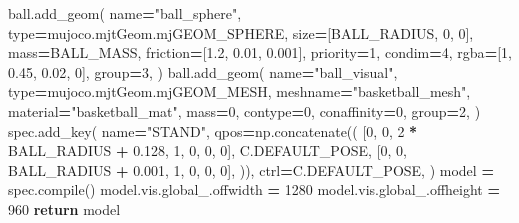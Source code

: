 \documentclass[
  american,
  11pt,
  letterpaper,
]{article}
\newenvironment{Shaded}{\begin{snugshade}}{\end{snugshade}}
\newcommand{\BuiltInTok}[1]{#1}
\newcommand{\ControlFlowTok}[1]{\textcolor[rgb]{0.13,0.29,0.53}{\textbf{#1}}}
\newcommand{\DecValTok}[1]{\textcolor[rgb]{0.00,0.00,0.81}{#1}}
\newcommand{\FloatTok}[1]{\textcolor[rgb]{0.00,0.00,0.81}{#1}}
\newcommand{\NormalTok}[1]{#1}
\newcommand{\OperatorTok}[1]{\textcolor[rgb]{0.81,0.36,0.00}{\textbf{#1}}}
\newcommand{\StringTok}[1]{\textcolor[rgb]{0.31,0.60,0.02}{#1}}
\renewenvironment{Shaded}{\par\smallskip}{\par\smallskip}
\begin{document}
\begin{Shaded}
\begin{Highlighting}[]
\NormalTok{    ball.add\_geom(}
\NormalTok{        name}\OperatorTok{=}\StringTok{"ball\_sphere"}\NormalTok{, }\BuiltInTok{type}\OperatorTok{=}\NormalTok{mujoco.mjtGeom.mjGEOM\_SPHERE,}
\NormalTok{        size}\OperatorTok{=}\NormalTok{[BALL\_RADIUS, }\DecValTok{0}\NormalTok{, }\DecValTok{0}\NormalTok{], mass}\OperatorTok{=}\NormalTok{BALL\_MASS, friction}\OperatorTok{=}\NormalTok{[}\FloatTok{1.2}\NormalTok{, }\FloatTok{0.01}\NormalTok{, }\FloatTok{0.001}\NormalTok{],}
\NormalTok{        priority}\OperatorTok{=}\DecValTok{1}\NormalTok{, condim}\OperatorTok{=}\DecValTok{4}\NormalTok{, rgba}\OperatorTok{=}\NormalTok{[}\DecValTok{1}\NormalTok{, }\FloatTok{0.45}\NormalTok{, }\FloatTok{0.02}\NormalTok{, }\DecValTok{0}\NormalTok{], group}\OperatorTok{=}\DecValTok{3}\NormalTok{,}
\NormalTok{    )}
\NormalTok{    ball.add\_geom(}
\NormalTok{        name}\OperatorTok{=}\StringTok{"ball\_visual"}\NormalTok{, }\BuiltInTok{type}\OperatorTok{=}\NormalTok{mujoco.mjtGeom.mjGEOM\_MESH,}
\NormalTok{        meshname}\OperatorTok{=}\StringTok{"basketball\_mesh"}\NormalTok{, material}\OperatorTok{=}\StringTok{"basketball\_mat"}\NormalTok{,}
\NormalTok{        mass}\OperatorTok{=}\DecValTok{0}\NormalTok{, contype}\OperatorTok{=}\DecValTok{0}\NormalTok{, conaffinity}\OperatorTok{=}\DecValTok{0}\NormalTok{, group}\OperatorTok{=}\DecValTok{2}\NormalTok{,}
\NormalTok{    )}
\NormalTok{    spec.add\_key(}
\NormalTok{        name}\OperatorTok{=}\StringTok{"STAND"}\NormalTok{, qpos}\OperatorTok{=}\NormalTok{np.concatenate((}
\NormalTok{            [}\DecValTok{0}\NormalTok{, }\DecValTok{0}\NormalTok{, }\DecValTok{2} \OperatorTok{*}\NormalTok{ BALL\_RADIUS }\OperatorTok{+} \FloatTok{0.128}\NormalTok{, }\DecValTok{1}\NormalTok{, }\DecValTok{0}\NormalTok{, }\DecValTok{0}\NormalTok{, }\DecValTok{0}\NormalTok{],}
\NormalTok{            C.DEFAULT\_POSE, [}\DecValTok{0}\NormalTok{, }\DecValTok{0}\NormalTok{, BALL\_RADIUS }\OperatorTok{+} \FloatTok{0.001}\NormalTok{, }\DecValTok{1}\NormalTok{, }\DecValTok{0}\NormalTok{, }\DecValTok{0}\NormalTok{, }\DecValTok{0}\NormalTok{],}
\NormalTok{        )), ctrl}\OperatorTok{=}\NormalTok{C.DEFAULT\_POSE,}
\NormalTok{    )}
\NormalTok{    model }\OperatorTok{=}\NormalTok{ spec.}\BuiltInTok{compile}\NormalTok{()}
\NormalTok{    model.vis.global\_.offwidth }\OperatorTok{=} \DecValTok{1280}
\NormalTok{    model.vis.global\_.offheight }\OperatorTok{=} \DecValTok{960}
    \ControlFlowTok{return}\NormalTok{ model}



\end{Highlighting}
\end{Shaded}
\end{document}
